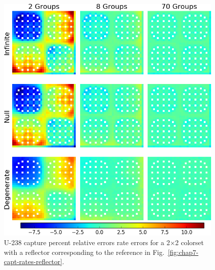 \begin{appendices}
\begin{figure}[h!]
\centering
\includegraphics[width=\linewidth]{figures/quantification/appendix/reflector/capt-err}
\vspace{2mm}
\caption[U-238 capture rate errors for a 2$\times$2 colorset with a reflector]{U-238 capture percent relative errors rate errors for a 2$\times$2 colorset with a reflector corresponding to the reference in Fig.~\ref{fig:chap7-capt-rates-reflector}.}
\label{fig:quantify-reflector-capt-err}
\end{figure}

\clearpage


\end{appendices}
